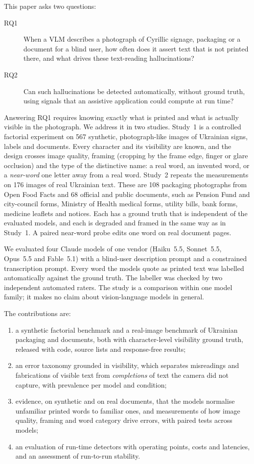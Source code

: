 \documentclass[pdflatex,sn-mathphys-num]{sn-jnl}%
\theoremstyle{thmstyleone}%
\theoremstyle{thmstyletwo}%
\theoremstyle{thmstylethree}%
\newcommand{\NDoc}{68}
\newcommand{\NImages}{567}
\newcommand{\NPack}{108}
\newcommand{\RealNImages}{176}
\begin{document}
This paper asks two questions:
\begin{description}
\item[RQ1] When a VLM describes a photograph of Cyrillic signage, packaging or a document for a blind user, how often does it assert text that is not printed there, and what drives these text-reading hallucinations?
\item[RQ2] Can such hallucinations be detected automatically, without ground truth, using signals that an assistive application could compute at run time?
\end{description}

Answering RQ1 requires knowing exactly what is printed and what is actually visible in the photograph. We address it in two studies. Study~1 is a controlled factorial experiment on \NImages{} synthetic, photograph-like images of Ukrainian signs, labels and documents. Every character and its visibility are known, and the design crosses image quality, framing (cropping by the frame edge, finger or glare occlusion) and the type of the distinctive name: a real word, an invented word, or a \emph{near-word} one letter away from a real word. Study~2 repeats the measurements on \RealNImages{} images of real Ukrainian text. These are \NPack{} packaging photographs from Open Food Facts and \NDoc{} official and public documents, such as Pension Fund and city-council forms, Ministry of Health medical forms, utility bills, bank forms, medicine leaflets and notices. Each has a ground truth that is independent of the evaluated models, and each is degraded and framed in the same way as in Study~1. A paired near-word probe edits one word on real document pages.

We evaluated four Claude models of one vendor (Haiku~5.5, Sonnet~5.5, Opus~5.5 and Fable~5.1) with a blind-user description prompt and a constrained transcription prompt. Every word the models quote as printed text was labelled automatically against the ground truth. The labeller was checked by two independent automated raters. The study is a comparison within one model family; it makes no claim about vision-language models in general.

The contributions are:
\begin{enumerate}
\item a synthetic factorial benchmark and a real-image benchmark of Ukrainian packaging and documents, both with character-level visibility ground truth, released with code, source lists and response-free results;
\item an error taxonomy grounded in visibility, which separates misreadings and fabrications of visible text from \emph{completions} of text the camera did not capture, with prevalence per model and condition;
\item evidence, on synthetic and on real documents, that the models normalise unfamiliar printed words to familiar ones, and measurements of how image quality, framing and word category drive errors, with paired tests across models;
\item an evaluation of run-time detectors with operating points, costs and latencies, and an assessment of run-to-run stability.
\end{enumerate}
\end{document}
